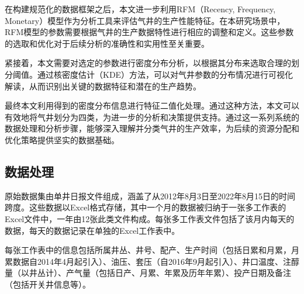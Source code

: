 在构建规范化的数据框架之后，本文进一步利用RFM（Recency, Frequency, Monetary）模型作为分析工具来评估气井的生产性能特征。在本研究场景中，RFM模型的参数需要根据气井的生产数据特性进行相应的调整和定义。这些参数的选取和优化对于后续分析的准确性和实用性至关重要。

紧接着，本文需要对选定的参数进行密度分布分析，以根据其分布来选取合理的划分阈值。通过核密度估计（KDE）方法，可以对气井参数的分布情况进行可视化解读，从而识别出关键的数据特征和潜在的生产趋势。

最终本文利用得到的密度分布信息进行特征二值化处理。通过这种方法，本文可以有效地将气井划分为四类，为进一步的分析和决策提供支持。通过这一系列系统的数据处理和分析步骤，能够深入理解并分类气井的生产效率，为后续的资源分配和优化策略提供坚实的数据基础。
\subsection{数据处理}
\label{cha:data}
原始数据集由单井日报文件组成，涵盖了从2012年8月3日至2022年8月15日的时间跨度。这些数据以Excel格式存储，其中一个月的数据被归纳于一张多工作表的Excel文件中，一年由12张此类文件构成。每张多工作表文件包括了该月内每天的数据，每天的数据记录在单独的Excel工作表中。

每张工作表中的信息包括所属井丛、井号、配产、生产时间（包括日累和月累，月累数据自2014年4月起引入）、油压、套压（自2016年9月起引入）、井口温度、注醇量（以井丛计）、产气量（包括日产、月累、年累及历年年累）、投产日期及备注（包括开关井信息等）。

